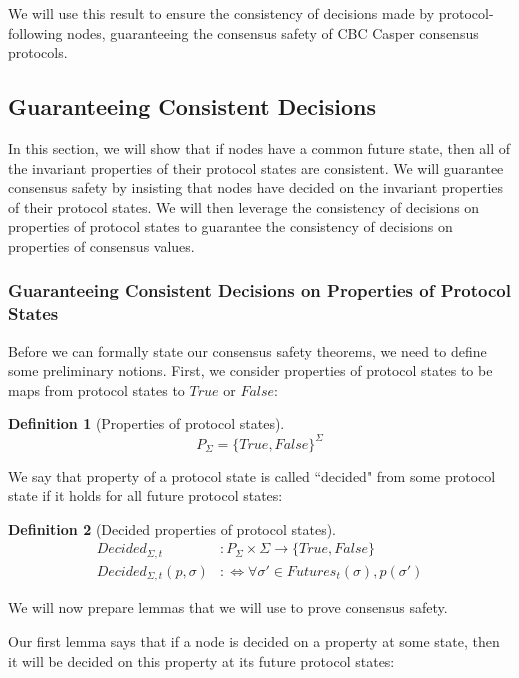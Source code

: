 \documentclass{article}
\theoremstyle{definition}
\newtheorem{defn}{Definition}[section]
\begin{document}
We will use this result to ensure the consistency of decisions made by protocol-following nodes, guaranteeing the consensus safety of CBC Casper consensus protocols.

\subsection{Guaranteeing Consistent Decisions}

In this section, we will show that if nodes have a common future state, then all of the invariant properties of their protocol states are consistent. We will guarantee consensus safety by insisting that nodes have decided on the invariant properties of their protocol states. We will then leverage the consistency of decisions on properties of protocol states to guarantee the consistency of decisions on properties of consensus values.

\subsubsection{Guaranteeing Consistent Decisions on Properties of Protocol States}

Before we can formally state our consensus safety theorems, we need to define some preliminary notions. First, we consider properties of protocol states to be maps from protocol states to $True$ or $False$:

\begin{defn}[Properties of protocol states]
$$
P_\Sigma = \{True, False\}^\Sigma  %
$$
\end{defn}

We say that property of a protocol state is called ``decided" from some protocol state if it holds for all future protocol states:

\begin{defn}[Decided properties of protocol states]
\begin{align}
Decided_{\Sigma, t}&: P_\Sigma \times \Sigma \to \{True,False\} \\
Decided_{\Sigma, t}(p, \sigma) &:\Leftrightarrow \forall \sigma' \in Futures_t(\sigma), p(\sigma')
\end{align}
\end{defn}

We will now prepare lemmas that we will use to prove consensus safety.

Our first lemma says that if a node is decided on a property at some state, then it will be decided on this property at its future protocol states:
\end{document}
